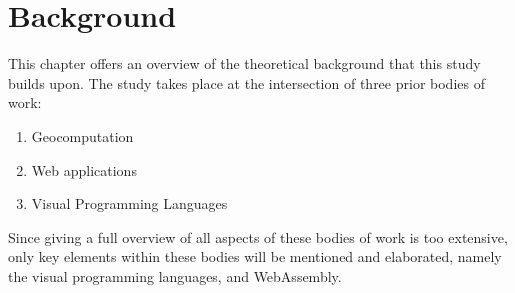 
\chapter{Background}
\label{chap:background}

This chapter offers an overview of the theoretical background that this study builds upon.
The study takes place at the intersection of three prior bodies of work:
\begin{enumerate}[-]
  \item Geocomputation
  \item Web applications
  \item Visual Programming Languages
\end{enumerate}

Since giving a full overview of all aspects of these bodies of work is too extensive, only key elements within these bodies will be mentioned and elaborated, namely the visual programming languages, and WebAssembly.  







